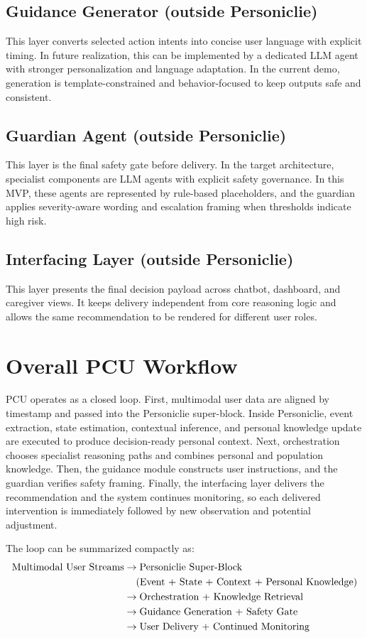 \documentclass[11pt]{article}
\begin{document}
\subsection{Guidance Generator (outside Personiclie)}
This layer converts selected action intents into concise user language with explicit timing. In future realization, this can be implemented by a dedicated LLM agent with stronger personalization and language adaptation. In the current demo, generation is template-constrained and behavior-focused to keep outputs safe and consistent.

\subsection{Guardian Agent (outside Personiclie)}
This layer is the final safety gate before delivery. In the target architecture, specialist components are LLM agents with explicit safety governance. In this MVP, these agents are represented by rule-based placeholders, and the guardian applies severity-aware wording and escalation framing when thresholds indicate high risk.

\subsection{Interfacing Layer (outside Personiclie)}
This layer presents the final decision payload across chatbot, dashboard, and caregiver views. It keeps delivery independent from core reasoning logic and allows the same recommendation to be rendered for different user roles.

\section{Overall PCU Workflow}
PCU operates as a closed loop. First, multimodal user data are aligned by timestamp and passed into the Personiclie super-block. Inside Personiclie, event extraction, state estimation, contextual inference, and personal knowledge update are executed to produce decision-ready personal context. Next, orchestration chooses specialist reasoning paths and combines personal and population knowledge. Then, the guidance module constructs user instructions, and the guardian verifies safety framing. Finally, the interfacing layer delivers the recommendation and the system continues monitoring, so each delivered intervention is immediately followed by new observation and potential adjustment.

The loop can be summarized compactly as:
\[
\begin{aligned}
\text{Multimodal User Streams}
&\rightarrow \text{Personiclie Super-Block} \\
&\hspace{1.2em}(\text{Event + State + Context + Personal Knowledge}) \\
&\rightarrow \text{Orchestration + Knowledge Retrieval} \\
&\rightarrow \text{Guidance Generation + Safety Gate} \\
&\rightarrow \text{User Delivery + Continued Monitoring}
\end{aligned}
\]
\end{document}
